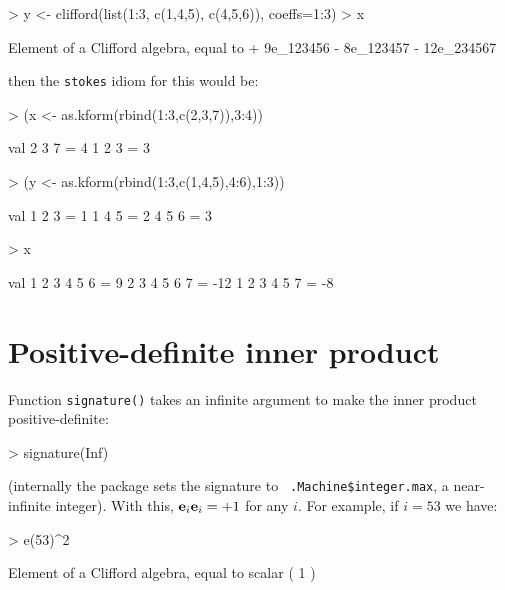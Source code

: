 \documentclass{birkjour}
\theoremstyle{definition}
\theoremstyle{remark}
\numberwithin{equation}{section}
\renewenvironment{Schunk}{\vspace{20pt}}{\vspace{20pt}}
\begin{document}
\begin{Schunk}
\begin{Sinput}
> y <- clifford(list(1:3, c(1,4,5), c(4,5,6)), coeffs=1:3)
> x %
\end{Sinput}
\begin{Soutput}
Element of a Clifford algebra, equal to
+ 9e_123456 - 8e_123457 - 12e_234567
\end{Soutput}
\end{Schunk}
%
then the {\tt stokes} idiom for this would be:

\begin{Schunk}
\begin{Sinput}
> (x <- as.kform(rbind(1:3,c(2,3,7)),3:4))
\end{Sinput}
\begin{Soutput}
           val
 2 3 7  =    4
 1 2 3  =    3
\end{Soutput}
\begin{Sinput}
> (y <- as.kform(rbind(1:3,c(1,4,5),4:6),1:3))
\end{Sinput}
\begin{Soutput}
           val
 1 2 3  =    1
 1 4 5  =    2
 4 5 6  =    3
\end{Soutput}
\begin{Sinput}
> x %
\end{Sinput}
\begin{Soutput}
                 val
 1 2 3 4 5 6  =    9
 2 3 4 5 6 7  =  -12
 1 2 3 4 5 7  =   -8
\end{Soutput}
\end{Schunk}

\section{Positive-definite inner product}

Function {\tt signature()} takes an infinite argument to make the
inner product positive-definite:

\begin{Schunk}
\begin{Sinput}
> signature(Inf)
\end{Sinput}
\end{Schunk}
%
(internally the package sets the signature to {\tt
  .Machine\$integer.max}, a near-infinite integer).  With this,
${\bf e}_{i}{\bf e}_{i}=+1$ for any $i$.  For example, if
  $i=53$ we have:

\begin{Schunk}
\begin{Sinput}
> e(53)^2
\end{Sinput}
\begin{Soutput}
Element of a Clifford algebra, equal to
scalar ( 1 )
\end{Soutput}
\end{Schunk}
\end{document}
